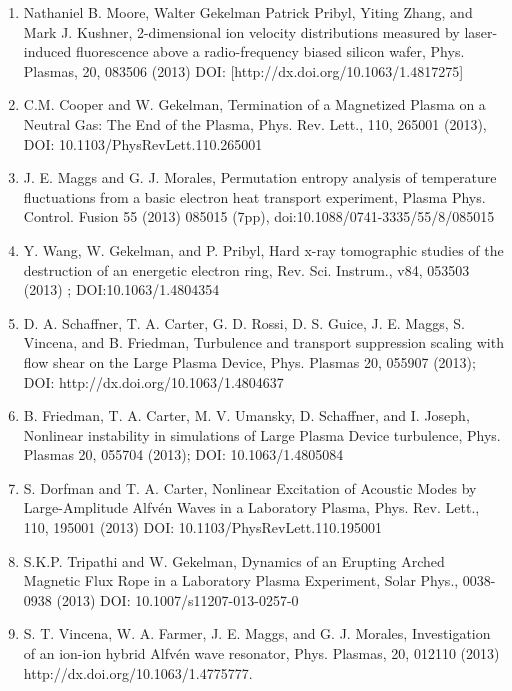\documentclass[11pt]{article}
\begin{document}
\begin{enumerate}
\item   Nathaniel B. Moore, Walter Gekelman Patrick Pribyl, Yiting Zhang, and Mark J. Kushner, 2-dimensional ion velocity distributions measured by laser-induced fluorescence above a radio-frequency biased silicon wafer, Phys. Plasmas, 20, 083506 (2013) DOI: [http://dx.doi.org/10.1063/1.4817275]

\item  C.M. Cooper and W. Gekelman, Termination of a Magnetized Plasma on a Neutral Gas: The End of the Plasma, Phys. Rev. Lett., 110, 265001 (2013), DOI: 10.1103/PhysRevLett.110.265001

\item   J. E. Maggs and G. J. Morales, Permutation entropy analysis of temperature fluctuations from a basic electron heat transport experiment, Plasma Phys. Control. Fusion 55 (2013) 085015 (7pp), doi:10.1088/0741-3335/55/8/085015

\item  Y. Wang, W. Gekelman, and P. Pribyl, Hard x-ray tomographic studies of the destruction of an energetic electron ring, Rev. Sci. Instrum., v84, 053503 (2013) ; DOI:10.1063/1.4804354

\item   D. A. Schaffner, T. A. Carter, G. D. Rossi, D. S. Guice, J. E. Maggs, S. Vincena, and B. Friedman, Turbulence and transport suppression scaling with flow shear on the Large Plasma Device, Phys. Plasmas 20, 055907 (2013); DOI: http://dx.doi.org/10.1063/1.4804637

\item   B. Friedman, T. A. Carter, M. V. Umansky, D. Schaffner, and I. Joseph, Nonlinear instability in simulations of Large Plasma Device turbulence, Phys. Plasmas 20, 055704 (2013); DOI: 10.1063/1.4805084

\item  S. Dorfman and T. A. Carter, Nonlinear Excitation of Acoustic Modes by Large-Amplitude Alfv\'{e}n Waves in a Laboratory Plasma, Phys. Rev. Lett., 110, 195001 (2013) DOI: 10.1103/PhysRevLett.110.195001

\item  S.K.P. Tripathi and W. Gekelman, Dynamics of an Erupting Arched Magnetic Flux Rope in a Laboratory Plasma Experiment, Solar Phys., 0038-0938 (2013) DOI: 10.1007/s11207-013-0257-0

\item   S. T. Vincena, W. A. Farmer, J. E. Maggs, and G. J. Morales, Investigation of an ion-ion hybrid Alfv\'{e}n wave resonator, Phys. Plasmas, 20, 012110 (2013) http://dx.doi.org/10.1063/1.4775777.


\end{enumerate}
\end{document}
